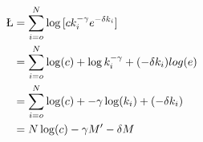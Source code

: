 \documentclass{article}
\begin{document}
\begin{subequations}
\begin{align}
    \L &= \sum_{i=o}^N \log{[ck_i^{-\gamma} e^{-\delta k_i}]}\\
       &= \sum_{i=o}^N \log(c) + \log{k_i^{-\gamma}} + (-\delta k_i) log(e)\\
       &= \sum_{i=o}^N \log(c) + -\gamma \log(k_i) + (-\delta k_i) \\
       &= N\log(c) -\gamma M' -\delta M  \\
\end{align}
\end{subequations}
\end{document}
